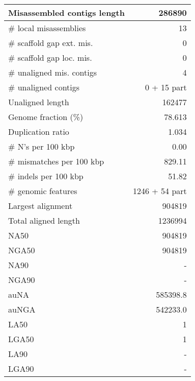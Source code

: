 \documentclass[12pt,a4paper]{article}
\begin{document}
\begin{table}[ht]
\begin{center}
\begin{tabular}{|l*{1}{|r}|}
Misassembled contigs length & 286890 \\ \hline
\# local misassemblies & 13 \\ \hline
\# scaffold gap ext. mis. & 0 \\ \hline
\# scaffold gap loc. mis. & 0 \\ \hline
\# unaligned mis. contigs & 4 \\ \hline
\# unaligned contigs & 0 + 15 part \\ \hline
Unaligned length & 162477 \\ \hline
Genome fraction (\%) & 78.613 \\ \hline
Duplication ratio & 1.034 \\ \hline
\# N's per 100 kbp & 0.00 \\ \hline
\# mismatches per 100 kbp & 829.11 \\ \hline
\# indels per 100 kbp & 51.82 \\ \hline
\# genomic features & 1246 + 54 part \\ \hline
Largest alignment & 904819 \\ \hline
Total aligned length & 1236994 \\ \hline
NA50 & 904819 \\ \hline
NGA50 & 904819 \\ \hline
NA90 & - \\ \hline
NGA90 & - \\ \hline
auNA & 585398.8 \\ \hline
auNGA & 542233.0 \\ \hline
LA50 & 1 \\ \hline
LGA50 & 1 \\ \hline
LA90 & - \\ \hline
LGA90 & - \\ \hline
\end{tabular}
\end{center}
\end{table}
\end{document}
